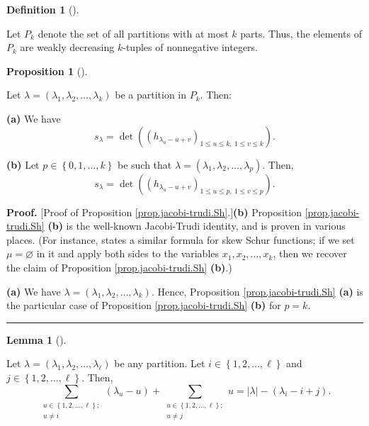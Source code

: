 \documentclass[numbers=enddot,12pt,final,onecolumn,notitlepage]{scrartcl}%
\theoremstyle{definition}
\newtheorem{lem}[theo]{Lemma}
\newenvironment{lemma}[1][]
{\begin{lem}[#1]\begin{leftbar}}
{\end{leftbar}\end{lem}}
\newtheorem{prop}[theo]{Proposition}
\newenvironment{proposition}[1][]
{\begin{prop}[#1]\begin{leftbar}}
{\end{leftbar}\end{prop}}
\newtheorem{defi}[theo]{Definition}
\newenvironment{definition}[1][]
{\begin{defi}[#1]\begin{leftbar}}
{\end{leftbar}\end{defi}}
\newenvironment{proof}[1][Proof]{\noindent\textbf{#1.} }{\ \rule{0.5em}{0.5em}}
\let\sumnonlimits\sum
\renewcommand{\sum}{\sumnonlimits\limits}
\begin{document}
\begin{definition}
\label{def.Pk}Let $P_{k}$ denote the set of all partitions with at most $k$
parts. Thus, the elements of $P_{k}$ are weakly decreasing $k$-tuples of
nonnegative integers.
\end{definition}

\begin{proposition}
\label{prop.jacobi-trudi.Sh}Let $\lambda=\left(  \lambda_{1},\lambda
_{2},\ldots,\lambda_{k}\right)  $ be a partition in $P_{k}$. Then:

\textbf{(a)} We have%
\[
s_{\lambda}=\det\left(  \left(  h_{\lambda_{u}-u+v}\right)  _{1\leq u\leq
k,\ 1\leq v\leq k}\right)  .
\]


\textbf{(b)} Let $p\in\left\{  0,1,\ldots,k\right\}  $ be such that
$\lambda=\left(  \lambda_{1},\lambda_{2},\ldots,\lambda_{p}\right)  $. Then,%
\[
s_{\lambda}=\det\left(  \left(  h_{\lambda_{u}-u+v}\right)  _{1\leq u\leq
p,\ 1\leq v\leq p}\right)  .
\]

\end{proposition}

\begin{proof}
[Proof of Proposition \ref{prop.jacobi-trudi.Sh}.]\textbf{(b)} Proposition
\ref{prop.jacobi-trudi.Sh} \textbf{(b)} is the well-known Jacobi-Trudi
identity, and is proven in various places. (For instance, \cite[(2.4.16)]%
{GriRei18} states a similar formula for skew Schur functions; if we set
$\mu=\varnothing$ in it and apply both sides to the variables $x_{1}%
,x_{2},\ldots,x_{k}$, then we recover the claim of Proposition
\ref{prop.jacobi-trudi.Sh} \textbf{(b)}.)

\textbf{(a)} We have $\lambda=\left(  \lambda_{1},\lambda_{2},\ldots
,\lambda_{k}\right)  $. Hence, Proposition \ref{prop.jacobi-trudi.Sh}
\textbf{(a)} is the particular case of Proposition \ref{prop.jacobi-trudi.Sh}
\textbf{(b)} for $p=k$.
\end{proof}

\begin{lemma}
\label{lem.lam-sum-deg-1}Let $\lambda=\left(  \lambda_{1},\lambda_{2}%
,\ldots,\lambda_{\ell}\right)  $ be any partition. Let $i\in\left\{
1,2,\ldots,\ell\right\}  $ and $j\in\left\{  1,2,\ldots,\ell\right\}  $. Then,%
\[
\sum_{\substack{u\in\left\{  1,2,\ldots,\ell\right\}  ;\\u\neq i}}\left(
\lambda_{u}-u\right)  +\sum_{\substack{u\in\left\{  1,2,\ldots,\ell\right\}
;\\u\neq j}}u=\left\vert \lambda\right\vert -\left(  \lambda_{i}-i+j\right)
.
\]

\end{lemma}
\end{document}
